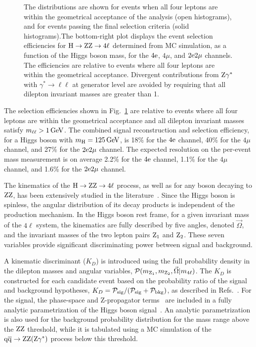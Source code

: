 \documentclass[12pt,twoside,a4paper,cmspaper,final,collab]{cms-tdr}
\begin{document}
\begin{figure}[htbp]
\begin{center}
{The distributions are shown for events when all four leptons are within the geometrical
acceptance of the analysis (open histograms), and for events passing the final selection
criteria (solid histograms).The bottom-right plot displays the event selection efficiencies
for $\mathrm{H} \to  \mathrm{Z}\mathrm{Z} \to 4\ell$  determined from MC simulation, as a function of the Higgs
boson mass, for the $4\mathrm{e}$, $4\mu$, and $2\mathrm{e} 2\mu$ channels. The efficiencies are
relative to events where all four leptons are within the geometrical acceptance.
Divergent contributions from $\mathrm{Z}\gamma^*$ with $\gamma^* \rightarrow \ell \ell$ at
generator level are avoided by requiring that all dilepton invariant masses are greater
than 1\GeV.}
\label{fig:leptonPT}
  \end{center}
\end{figure}
The selection efficiencies shown in Fig.~\ref{fig:leptonPT} are relative to events where all
four leptons  are within the
geometrical acceptance and all dilepton invariant masses satisfy $m_{\ell\ell} > 1\,\text{Ge\hspace{-.08em}V}$.
The combined signal reconstruction and selection efficiency, for
a Higgs boson with $m_{\mathrm{H}} = 125\,\text{Ge\hspace{-.08em}V}$,
is 18\% for the $4\mathrm{e}$ channel, 40\% for the $4\mu$ channel,
and 27\% for the $2\mathrm{e}2\mu$ channel.
The expected resolution on the per-event mass measurement is on average  2.2\%
for the $4\mathrm{e}$ channel, 1.1\% for the $4\mu$ channel, and 1.6\% for the $2\mathrm{e}2\mu$ channel.

The kinematics of the $\mathrm{H}\rightarrow\mathrm{Z}\mathrm{Z}\rightarrow 4\ell$
process, as well as for any
boson decaying to  $\mathrm{Z}\mathrm{Z}$, has been extensively studied in the
literature~\cite{Soni:1993jc,Barger:1993wt,Choi:2002jk,Allanach:2002gn,Choi:2002jk,
Buszello:2002uu,Godbole:2007cn,Keung:2008ve,Antipin:2008hj,Hagiwara:2009wt,
Gao:2010qx,DeRujula:2010ys,Gainer:2011xz,Bolognesi:2012mm}.
Since the Higgs boson is spinless, the angular distribution of its decay products
is independent of the production mechanism.
In the Higgs boson rest frame, for a given invariant mass of the $4\ell$ system, the kinematics are fully
described by five angles, denoted $\vec{\Omega}$, and the invariant masses of the two lepton
pairs $\mathrm{Z}_1$ and $\mathrm{Z}_2$. %
These seven variables provide  significant discriminating power between signal and background.

A kinematic discriminant ($K_{D}$) is introduced using the full probability density in the dilepton
masses and angular variables, ${\cal P}(m_{\cPZ_1},m_{\cPZ_2},\vec{\Omega}|m_{4\ell})$.
The $K_{D}$ is constructed for each candidate event  based on the probability ratio of the signal and background
hypotheses, $K_{D}={\cal P_\mathrm{sig}}/({\cal P_\mathrm{sig}}+{\cal P_\mathrm{bkg}})$,
as described in Refs.~\cite{Chatrchyan:2012sn,CMSobservation125}.
For the signal, the phase-space and Z-propagator terms~\cite{Choi:2002jk} are
included in a fully analytic parametrization of the Higgs boson signal~\cite{Gao:2010qx}.
An analytic parametrization is also used for the background probability distribution for the mass
range above the $\mathrm{Z}\mathrm{Z}$ threshold, while it is  tabulated using a MC simulation of the
$\mathrm{q}\overline{\mathrm{q}}\to\mathrm{Z}\mathrm{Z}(\mathrm{Z}\gamma^*)$ process below this threshold.
\end{document}
